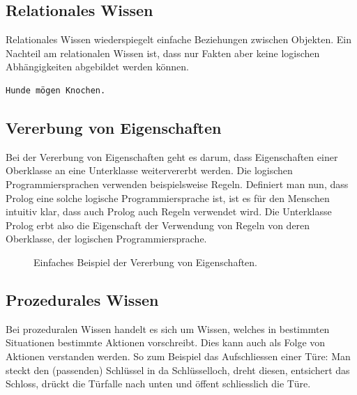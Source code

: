 \subsection{Relationales Wissen}
\label{subsec:relationales_wissen}
Relationales Wissen wiederspiegelt einfache Beziehungen zwischen Objekten. Ein Nachteil am relationalen Wissen ist, dass nur Fakten aber keine logischen Abhängigkeiten abgebildet werden können.

\begin{lstlisting}[caption={Einfaches Beispiel von relationalem Wissen.}]
    Hunde mögen Knochen.
\end{lstlisting}

\newpage

\subsection{Vererbung von Eigenschaften}
\label{subsec:vererbung_eigenschaft}
Bei der Vererbung von Eigenschaften geht es darum, dass Eigenschaften einer Oberklasse an eine Unterklasse weitervererbt werden. Die logischen Programmiersprachen verwenden beispielsweise Regeln. Definiert man nun, dass Prolog eine solche logische Programmiersprache ist, ist es für den Menschen intuitiv klar, dass auch Prolog auch Regeln verwendet wird. Die Unterklasse Prolog erbt also die Eigenschaft der Verwendung von Regeln von deren Oberklasse, der logischen Programmiersprache.

\begin{figure}[htbp]
\centering {}
\caption{Einfaches Beispiel der Vererbung von Eigenschaften.\label{fig:experten_systeme_vererbung}\protect\footnotemark}
\end{figure}

\subsection{Prozedurales Wissen}
\label{subsec:prozedurales_wissen}
Bei prozeduralen Wissen handelt es sich um Wissen, welches in bestimmten Situationen bestimmte Aktionen vorschreibt. Dies kann auch als Folge von Aktionen verstanden werden. So zum Beispiel das Aufschliessen einer Türe: Man steckt den (passenden) Schlüssel in da Schlüsselloch, dreht diesen, entsichert das Schloss, drückt die Türfalle nach unten und öffent schliesslich die Türe.

